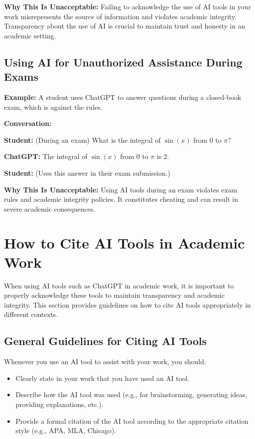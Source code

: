 \documentclass{article}
\begin{document}
\textbf{Why This Is Unacceptable:} Failing to acknowledge the use of AI tools in your work misrepresents the source of information and violates academic integrity. Transparency about the use of AI is crucial to maintain trust and honesty in an academic setting.

\subsection{Using AI for Unauthorized Assistance During Exams}

\textbf{Example:} A student uses ChatGPT to answer questions during a closed-book exam, which is against the rules.

\textbf{Conversation:}
\begin{mdframed}
\begin{flushleft}
\textbf{Student:} (During an exam) What is the integral of \(\sin(x)\) from 0 to \(\pi\)?

\textbf{ChatGPT:} The integral of \(\sin(x)\) from 0 to \(\pi\) is 2.

\textbf{Student:} (Uses this answer in their exam submission.)
\end{flushleft}
\end{mdframed}

\textbf{Why This Is Unacceptable:} Using AI tools during an exam violates exam rules and academic integrity policies. It constitutes cheating and can result in severe academic consequences.


\section{How to Cite AI Tools in Academic Work}

When using AI tools such as ChatGPT in academic work, it is important to properly acknowledge these tools to maintain transparency and academic integrity. This section provides guidelines on how to cite AI tools appropriately in different contexts.

\subsection{General Guidelines for Citing AI Tools}

Whenever you use an AI tool to assist with your work, you should:
\begin{itemize}
    \item Clearly state in your work that you have used an AI tool.
    \item Describe how the AI tool was used (e.g., for brainstorming, generating ideas, providing explanations, etc.).
    \item Provide a formal citation of the AI tool according to the appropriate citation style (e.g., APA, MLA, Chicago).
\end{itemize}
\end{document}
